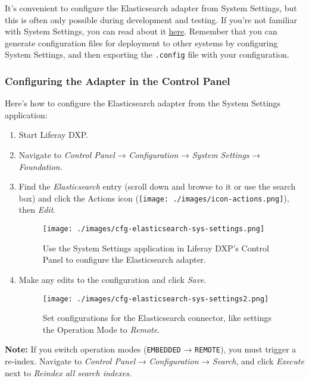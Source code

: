 It's convenient to configure the Elasticsearch adapter from System
Settings, but this is often only possible during development and
testing. If you're not familiar with System Settings, you can read about
it \href{/docs/7-1/user/-/knowledge_base/u/system-settings}{here}.
Remember that you can generate configuration files for deployment to
other systems by configuring System Settings, and then exporting the
\texttt{.config} file with your configuration.

\subsubsection{Configuring the Adapter in the Control
Panel}\label{configuring-the-adapter-in-the-control-panel-1}

Here's how to configure the Elasticsearch adapter from the System
Settings application:

\begin{enumerate}
\def\labelenumi{\arabic{enumi}.}
\item
  Start Liferay DXP.
\item
  Navigate to \emph{Control Panel} → \emph{Configuration} → \emph{System
  Settings} → \emph{Foundation}.
\item
  Find the \emph{Elasticsearch} entry (scroll down and browse to it or
  use the search box) and click the Actions icon
  (\texttt{[image: ./images/icon-actions.png]}), then \emph{Edit}.

  \begin{figure}
  \centering
  \texttt{[image: ./images/cfg-elasticsearch-sys-settings.png]}
  \caption{Use the System Settings application in Liferay DXP's Control
  Panel to configure the Elasticsearch adapter.}
  \end{figure}
\item
  Make any edits to the configuration and click \emph{Save}.

  \begin{figure}
  \centering
  \texttt{[image: ./images/cfg-elasticsearch-sys-settings2.png]}
  \caption{Set configurations for the Elasticsearch connector, like
  settings the Operation Mode to \emph{Remote}.}
  \end{figure}
\end{enumerate}

\noindent\hrulefill

\textbf{Note:} If you switch operation modes (\texttt{EMBEDDED} →
\texttt{REMOTE}), you must trigger a re-index. Navigate to \emph{Control
Panel} → \emph{Configuration} → \emph{Search}, and click \emph{Execute}
next to \emph{Reindex all search indexes.}

